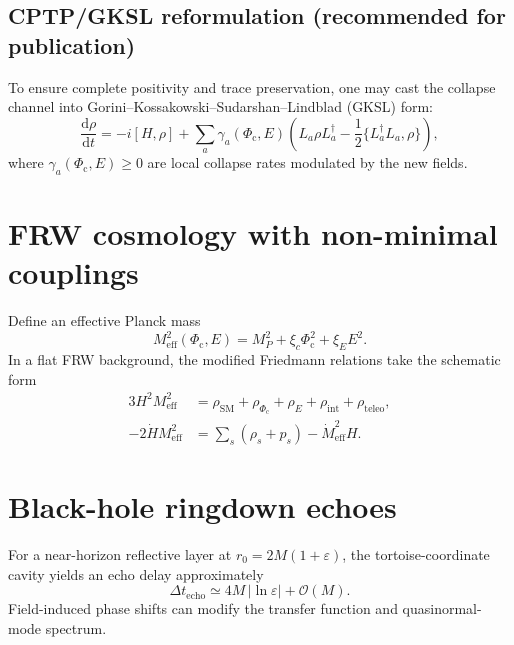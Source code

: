 \documentclass[11pt]{article}
\newcommand{\Phic}{\Phi_{\mathrm{c}}}
\newcommand{\Eth}{E}
\newcommand{\order}{\mathcal{O}}
\newcommand{\dd}{\mathrm{d}}
\begin{document}
\subsection{CPTP/GKSL reformulation (recommended for publication)}
To ensure complete positivity and trace preservation, one may cast the collapse channel into
Gorini--Kossakowski--Sudarshan--Lindblad (GKSL) form:
\begin{equation}
\frac{\dd \rho}{\dd t}
=
-i[H,\rho]
+\sum_a \gamma_a(\Phic,\Eth)\left(
L_a \rho L_a^\dagger - \frac{1}{2}\{L_a^\dagger L_a,\rho\}
\right),
\label{eq:gksl}
\end{equation}
where $\gamma_a(\Phic,\Eth)\ge 0$ are local collapse rates modulated by the new fields.

\section{FRW cosmology with non-minimal couplings}
Define an effective Planck mass
\begin{equation}
M^2_{\mathrm{eff}}(\Phic,\Eth) = M_P^2 + \xi_c \Phic^2 + \xi_E \Eth^2.
\end{equation}
In a flat FRW background, the modified Friedmann relations take the schematic form
\begin{align}
3H^2 M^2_{\mathrm{eff}}
&= \rho_{\mathrm{SM}}+\rho_{\Phic}+\rho_{\Eth}+\rho_{\mathrm{int}}+\rho_{\mathrm{teleo}},
\\
-2\dot{H} M^2_{\mathrm{eff}}
&=
\sum_s (\rho_s+p_s) - \dot{M}^2_{\mathrm{eff}}H .
\label{eq:frw}
\end{align}

\section{Black-hole ringdown echoes}
For a near-horizon reflective layer at $r_0=2M(1+\varepsilon)$, the tortoise-coordinate cavity yields an
echo delay approximately
\begin{equation}
\Delta t_{\mathrm{echo}} \simeq 4M\,|\ln \varepsilon| + \order(M).
\label{eq:echo}
\end{equation}
Field-induced phase shifts can modify the transfer function and quasinormal-mode spectrum.
\end{document}

